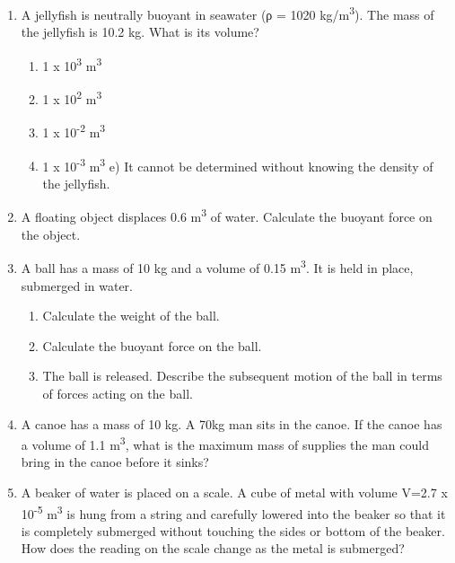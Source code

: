 \documentclass[letterpaper, 11pt]{article}
\begin{document}
\begin{enumerate}
	\item A jellyfish is neutrally buoyant in seawater (ρ = 1020 kg/m\textsuperscript{3}).  The mass of the jellyfish is 10.2 kg.  What is its volume?
	\begin{enumerate}
		\item 1 x 10\textsuperscript{3} m\textsuperscript{3}
		\item 1 x 10\textsuperscript{2} m\textsuperscript{3}
 		\item 1 x 10\textsuperscript{-2} m\textsuperscript{3}
 		\item 1 x 10\textsuperscript{-3} m\textsuperscript{3}
 		e) It cannot be determined without knowing the density of the jellyfish.
	\end{enumerate}
 	\vspace{.15in}
 	\item A floating object displaces 0.6 m\textsuperscript{3} of water. Calculate the buoyant force on the object.
 	\vspace{.95in}
 	
 	\item A ball has a mass of 10 kg and a volume of 0.15 m\textsuperscript{3}.  It is held in place, submerged in water.
	\begin{enumerate}
		\vspace{-.1in}
		\item Calculate the weight of the ball.
		\vspace{.35in}
		\item Calculate the buoyant force on the ball.
		\vspace{.35in}
 		\item The ball is released.  Describe the subsequent motion of the ball in terms of forces acting on the ball.
 		\vspace{.35in}
 		
\end{enumerate}
 
 \item A canoe has a mass of 10 kg.  A 70kg man sits in the canoe.  If the canoe has a volume of 1.1 m\textsuperscript{3}, what is the maximum mass of supplies the man could bring in the canoe before it sinks?
 \vspace{.4in}
 
 \item A beaker of water is placed on a scale.  A cube of metal with volume V=2.7 x 10\textsuperscript{-5} m\textsuperscript{3}  is hung from a string and carefully lowered into the beaker so that it is completely submerged without touching the sides or bottom of the beaker.  How does the reading on the scale change as the metal is submerged? 


\end{enumerate}
\end{document}
